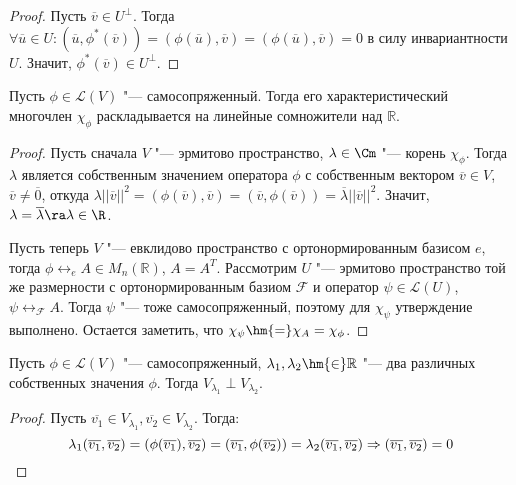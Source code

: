 \begin{proof}
    Пусть $\overline{v} \in U^\perp$. Тогда $\forall \overline{u} \in U: (\overline{u}, \phi^*(\overline{v})) = (\phi(\overline{u}), \overline{v}) = (\phi(\overline{u}), \overline{v}) = 0$ в силу инвариантности $U$. Значит, $\phi^*(\overline{v}) \in U^\perp$.
\end{proof}

\begin{proposition}
    Пусть $\phi \in \mathcal{L}(V)$ "--- самосопряженный. Тогда его характеристический многочлен $\chi_\phi$ раскладывается на линейные сомножители над $\mathbb{R}$.
\end{proposition}

\begin{proof}
    Пусть сначала $V$ "--- эрмитово пространство, $\lambda \in \Cm$ "--- корень $\chi_\phi$. Тогда $\lambda$ является собственным значением оператора $\phi$ с собственным вектором $\overline{v} \in V$, $\overline{v} \ne \overline{0}$, откуда $\lambda||\overline{v}||^2 = (\phi(\overline{v}), \overline{v}) = (\overline{v}, \phi(\overline{v})) = \overline{\lambda}||\overline{v}||^2$. Значит, $\lambda = \overline\lambda \ra \lambda \in \R$.
    
    Пусть теперь $V$ "--- евклидово пространство с ортонормированным базисом $e$, тогда $\phi \leftrightarrow_e A \in M_n(\mathbb{R})$, $A = A^T$. Рассмотрим $U$ "--- эрмитово пространство той же размерности с ортонормированным базиом $\mathcal{F}$ и оператор $\psi \in \mathcal{L}(U)$, $\psi \leftrightarrow_{\mathcal{F}} A$. Тогда $\psi$ "--- тоже самосопряженный, поэтому для $\chi_\psi$ утверждение выполнено. Остается заметить, что $\chi_\psi \hm{=} \chi_A = \chi_\phi$.
\end{proof}

\begin{proposition}
    Пусть $\phi \in \mathcal{L}(V)$ "--- самосопряженный, $\lambda_1, \lambda_2 \hm{\in} \mathbb{R}$ "--- два различных собственных значения $\phi$. Тогда $V_{\lambda_1} \perp V_{\lambda_2}$.
\end{proposition}

\begin{proof}
    Пусть $\overline{v_1} \in V_{\lambda_1}, \overline{v_2} \in V_{\lambda_2}$. Тогда:
    \[\lambda_1(\overline{v_1}, \overline{v_2}) = (\phi(\overline{v_1}), \overline{v_2}) = (\overline{v_1}, \phi(\overline{v_2})) = \lambda_2(\overline{v_1}, \overline{v_2}) \Rightarrow (\overline{v_1}, \overline{v_2}) = 0\qedhere\]
\end{proof}

